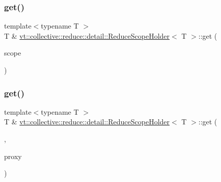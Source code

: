 \subsubsection{\texorpdfstring{get()}{get()}\hspace{0.1cm}{\footnotesize\ttfamily [1/6]}}
{\footnotesize\ttfamily template$<$typename T $>$ \\
T \& \hyperlink{structvt_1_1collective_1_1reduce_1_1detail_1_1_reduce_scope_holder}{vt\+::collective\+::reduce\+::detail\+::\+Reduce\+Scope\+Holder}$<$ T $>$\+::get (\begin{DoxyParamCaption}\item[{\hyperlink{structvt_1_1collective_1_1reduce_1_1detail_1_1_reduce_scope}{Reduce\+Scope} const \&}]{scope }\end{DoxyParamCaption})}

\mbox{\label{structvt_1_1collective_1_1reduce_1_1detail_1_1_reduce_scope_holder_accca4de877182ade06a16d3954590e51}} 
\subsubsection{\texorpdfstring{get()}{get()}\hspace{0.1cm}{\footnotesize\ttfamily [2/6]}}
{\footnotesize\ttfamily template$<$typename T $>$ \\
T \& \hyperlink{structvt_1_1collective_1_1reduce_1_1detail_1_1_reduce_scope_holder}{vt\+::collective\+::reduce\+::detail\+::\+Reduce\+Scope\+Holder}$<$ T $>$\+::get (\begin{DoxyParamCaption}\item[{\hyperlink{structvt_1_1collective_1_1reduce_1_1detail_1_1_reduce_scope_holder_1_1_obj_group_tag}{Obj\+Group\+Tag}}]{,  }\item[{\hyperlink{namespacevt_ad7cae989df485fccca57f0792a880a8e}{Obj\+Group\+Proxy\+Type}}]{proxy }\end{DoxyParamCaption})}

\mbox{\label{structvt_1_1collective_1_1reduce_1_1detail_1_1_reduce_scope_holder_aa20f0ff351bc6bcccea68e8cd4651969}} 
